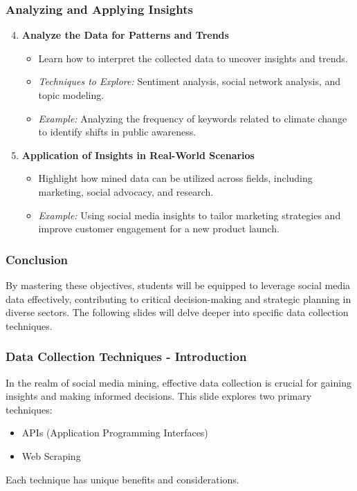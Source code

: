 \documentclass{beamer}
\begin{document}
\begin{frame}[fragile]
    \frametitle{Analyzing and Applying Insights}
    \begin{enumerate}
        \setcounter{enumi}{3} %
        \item \textbf{Analyze the Data for Patterns and Trends}
        \begin{itemize}
            \item Learn how to interpret the collected data to uncover insights and trends.
            \item \textit{Techniques to Explore:} Sentiment analysis, social network analysis, and topic modeling.
            \item \textit{Example:} Analyzing the frequency of keywords related to climate change to identify shifts in public awareness.
        \end{itemize}

        \item \textbf{Application of Insights in Real-World Scenarios}
        \begin{itemize}
            \item Highlight how mined data can be utilized across fields, including marketing, social advocacy, and research.
            \item \textit{Example:} Using social media insights to tailor marketing strategies and improve customer engagement for a new product launch.
        \end{itemize}
    \end{enumerate}
\end{frame}

\begin{frame}[fragile]
    \frametitle{Conclusion}
    By mastering these objectives, students will be equipped to leverage social media data effectively, contributing to critical decision-making and strategic planning in diverse sectors. The following slides will delve deeper into specific data collection techniques.
\end{frame}

\begin{frame}
    \frametitle{Data Collection Techniques - Introduction}
    In the realm of social media mining, effective data collection is crucial for gaining insights and making informed decisions. This slide explores two primary techniques: 
    \begin{itemize}
        \item APIs (Application Programming Interfaces)
        \item Web Scraping
    \end{itemize}
    Each technique has unique benefits and considerations.
\end{frame}
\end{document}
